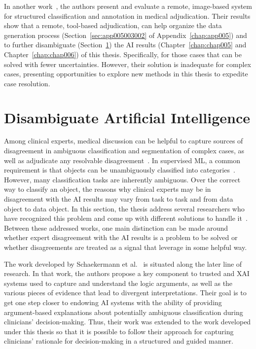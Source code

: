 \textcolor{revised}{In another work~\cite{10.1167/tvst.8.6.40}, the authors present and evaluate a remote, image-based system for structured classification and annotation in medical adjudication.
Their results show that a remote, tool-based adjudication, can help organize the data generation process (Section~\ref{sec:app005003002} of Appendix~\ref{chap:app005}) and to further disambiguate (Section~\ref{sec:chap003007}) the \ac{AI} results (Chapter~\ref{chap:chap005} and Chapter~\ref{chap:chap006}) of this thesis.
Specifically, for those cases that can be solved with fewer uncertainties.
However, their solution is inadequate for complex cases, presenting opportunities to explore new methods in this thesis to expedite case resolution.}

\section{Disambiguate Artificial Intelligence}
\label{sec:chap003007}

Among clinical experts, medical discussion can be helpful to capture sources of disagreement in ambiguous classification and segmentation of complex cases, as well as adjudicate any resolvable disagreement~\cite{10.1145/3308560.3317085}.
In supervised \ac{ML}, a common requirement is that objects can be unambiguously classified into categories~\cite{10.1145/3287560.3287596}.
However, many classification tasks are inherently ambiguous.
Over the correct way to classify an object, the reasons why clinical experts may be in disagreement with the \ac{AI} results may vary from task to task and from data object to data object.
In this section, the thesis address several researchers who have recognized this problem and come up with different solutions to handle it~\cite{10.1145/3313831.3376506, 10.1145/3313831.3376590, Tschandl2020}.
Between these addressed works, one main distinction can be made around whether expert disagreement with the \ac{AI} results is a problem to be solved or whether disagreements are treated as a signal that leverage in some helpful way.

The work developed by Schaekermann et al.~\cite{10.1145/3308560.3317085} is situated along the later line of research.
In that work, the authors propose a key component to trusted and \ac{XAI} systems used to capture and understand the logic arguments, as well as the various pieces of evidence that lead to divergent interpretations.
Their goal is to get one step closer to endowing \ac{AI} systems with the ability of providing argument-based explanations about potentially ambiguous classification during clinicians' decision-making.
Thus, their work was extended to the work developed under this thesis so that it is possible to follow their approach for capturing clinicians' rationale for decision-making in a structured and guided manner.

